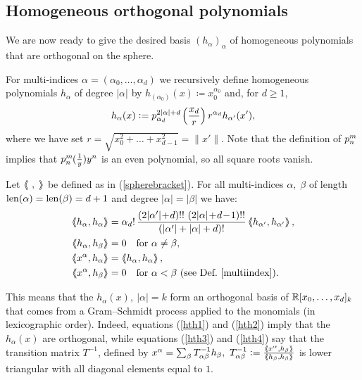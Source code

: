 \subsection{Homogeneous orthogonal polynomials} \label{hsection}
We are now ready to give the desired basis $(h_\alpha)_\alpha$ of homogeneous polynomials that are orthogonal on the sphere. 
\begin{definition} \label{hdef}
For multi-indices $\alpha=(\alpha_0,\ldots,\alpha_d)$ we recursively define homogeneous polynomials $h_\alpha$ of degree $|\alpha |$ by $h_{(\alpha_0)}(x) \coloneqq x_0^{\alpha_0}$ and, for $d\geq 1$,
$$
h_\alpha(x) \vcentcolon= p_{\alpha_d}^{2|\alpha |+d}\;\!\!\left(\frac{x_d}{r}\right) r^{\alpha_d}h_{\alpha'}(x'),
$$
where we have set $r=\sqrt{x_0^2 +\ldots+x_{d-1}^2}=\|x'\|$. Note that the definition of $p_{n}^{m}\;\!\!$ implies that $p_{n}^{m}\;\!\!(\frac{1}{y})y^n$ is an even polynomial, so all square roots vanish.
\end{definition}
\begin{theorem} Let $\left<\!\!\!\:\left<\ ,\;\right>\!\!\!\:\right>$ be defined as in (\ref{spherebracket}).
For all multi-indices $\alpha,\;\beta$ of length $\operatorname{len}(\alpha)=\operatorname{len}(\beta)=d+1$ and degree $|\alpha|=|\beta|$ we have:
\begin{align} \label{hth1}
\bra h_\alpha ,h_\alpha \ket &= \alpha_d!\,\frac{\left(2|\alpha '|\!+\!d\right)!!\,\left(2|\alpha |\!+\!d\!-\!1\right)!!}{\left(|\alpha '|+|\alpha |+d\right)!}\bra h_{\alpha '},h_{\alpha '}\ket ,\\
\label{hth2}
\bra h_\alpha,h_\beta \ket &= 0 \quad\text{for }\alpha\neq\beta,\\
\label{hth3}
\bra x^\alpha, h_\alpha \ket &= \bra h_\alpha ,h_\alpha \ket ,\\
\label{hth4}
\bra x^\alpha,h_\beta \ket &= 0 \quad\text{for }\alpha < \beta\ \text{(see Def.~\ref{multiindex})}.
\end{align}
\end{theorem}
\begin{remark}
This means that the $h_\alpha(x),\ |\alpha|=k$ form an orthogonal basis of $\mathbb{R}[x_0,\ldots,x_d]_k$ that comes from a Gram--Schmidt process applied to the monomials (in lexicographic order). Indeed, equations (\ref{hth1}) and (\ref{hth2}) imply that the $h_\alpha(x)$ are orthogonal, while equations (\ref{hth3}) and (\ref{hth4}) say that the transition matrix $T^{-1}$, defined by $ x^\alpha = \sum_\beta T^{-1}_{\alpha\beta}h_\beta,\ T^{-1}_{\alpha\beta} \coloneqq \frac{\bra x^\alpha,h_\beta\ket}{\bra h_\beta,h_\beta\ket} $ is lower triangular with all diagonal elements equal to $1$.
\end{remark}
